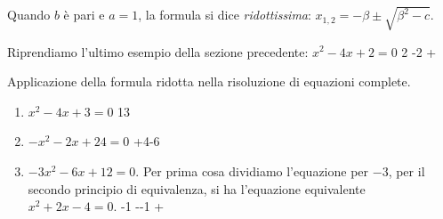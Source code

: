 Quando \(b\) è pari e \(a = 1\), la formula si dice \emph{ridottissima}: 
\(x_{1,2}=-\beta \pm \sqrt{\beta^2 -c}\).

\begin{esempio}
Riprendiamo l'ultimo esempio della sezione precedente: 
\(x^2 -4 x +2=0\)
         {2 -}{2 +}
\end{esempio}
\begin{esempio}
 Applicazione della formula ridotta nella risoluzione di equazioni complete.
\begin{enumerate}
\item \(x^2 -4x +3=0\)
         {1}{3}
\item \(-x^2 -2x +24 = 0\)
         {+4}{-6}
\item \(-3 x^2 -6 x +12=0\). Per prima cosa dividiamo l'equazione per 
\(-3\), 
per il secondo principio di equivalenza, si ha l'equazione equivalente~
\(x^2 +2x -4 = 0\). 
         {-1 -}{-1 +}
\end{enumerate}
\end{esempio}


